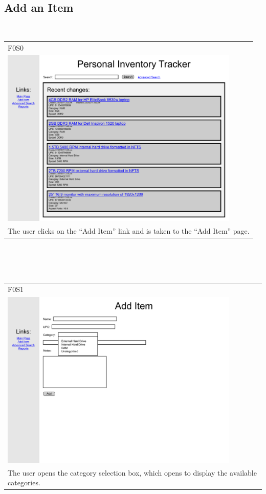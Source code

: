 \documentclass{article}
\begin{document}
\subsection{Add an Item}
\clearpage
~\\
\begin{tabular}{ p{4.5in} }
F0S0\\
\includegraphics[keepaspectratio, width=4.5in]{addItemF0S0.pdf}\\
The user clicks on the ``Add Item'' link and is taken to the ``Add Item'' page. 
\end{tabular}\\
~\\
~\\
\begin{tabular}{ p{4.5in} }
F0S1\\
\includegraphics[keepaspectratio, width=4.5in]{addItemF0S1.pdf}\\
The user opens the category selection box, which opens to display the available categories.
\end{tabular}\\
\end{document}
